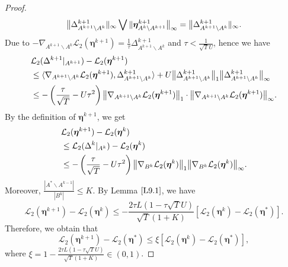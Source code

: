 \documentclass[12pt]{article}
\newcommand{\bb}{\Delta}
\newcommand{\boldeta}{\boldsymbol{\eta}}
\begin{document}
\begin{appendix}
\begin{proof}
\begin{equation*}
\big{\|}\bb_{A^{k+1}\backslash A^{k}}^{k+1}\|_{\infty}\bigvee\|\boldeta_{A^{k}\backslash A^{k+1}}^{k+1}\big{\|}_{\infty}=\big{\|}\bb_{A^{k+1}\backslash A^{k}}^{k+1}\|_{\infty}.
\end{equation*}
Due to $-\nabla_{A^{k+1}\backslash A^{k}}\mathcal{L}_2(\boldeta^{k+1})=\frac{1}{\tau}\bb_{A^{k+1}\backslash A^{k}}^{k+1}$ and $\tau<\frac{1}{ \sqrt{T}U}$, hence we have
\begin{equation*}
\begin{split}
&\mathcal{L}_2(\bb^{k+1}|_{A^{k+1}})-\mathcal{L}_2(\boldeta^{k+1})\\
&\leq\langle\nabla_{A^{k+1}\backslash A^{k}}\mathcal{L}_2(\boldeta^{k+1}),\bb_{A^{k+1}\backslash A^{k}}^{k+1}\rangle+U\big{\|}\bb_{A^{k+1}\backslash A^{k}}^{k+1}\big{\|}_1\big{\|}\bb_{A^{k+1}\backslash A^{k}}^{k+1}\big{\|}_{\infty}\\
&\leq-\left(\frac{\tau}{ \sqrt{T}}-U\tau^2\right)\big{\|}\nabla_{A^{k+1}\backslash A^{k}}\mathcal{L}_2(\boldeta^{k+1})\big{\|}_1\cdot\big{\|}\nabla_{A^{k+1}\backslash A^{k}}\mathcal{L}_2(\boldeta^{k+1})\big{\|}_{\infty}.
\end{split}
\end{equation*}
By the definition of $\boldeta^{k+1}$, we  get
\begin{equation*}
\begin{split}
&\mathcal{L}_2(\boldeta^{k+1})-\mathcal{L}_2(\boldeta^{k})\\
&\leq \mathcal{L}_2(\bb^{k}|_{A^{k}})-\mathcal{L}_2(\boldeta^{k})\\
&\leq-\left(\frac{\tau}{ \sqrt{T}}-U\tau^2\right)\big{\|}\nabla_{B^k}\mathcal{L}_2(\boldeta^{k})\big{\|}_1\big{\|}\nabla_{B^k}\mathcal{L}_2(\boldeta^{k})\big{\|}_{\infty}.
\end{split}
\end{equation*}
Moreover, $\frac{|A^*\backslash A^{k-1}|}{|B^{k}|}\leq K$.
By Lemma $\ref{L9.1}$, we have
\begin{equation*}
\mathcal{L}_2(\boldeta^{k+1})-\mathcal{L}_2(\boldeta^{k})\leq-\frac{2\tau L(1-\tau \sqrt{T} U)}{ \sqrt{T}(1+K)}[\mathcal{L}_2(\boldeta^{k})-\mathcal{L}_2(\boldeta^{*})].
\end{equation*}
Therefore, we obtain that
 \begin{equation*}
\mathcal{L}_2(\boldeta^{k+1})-\mathcal{L}_2(\boldeta^*)\leq\xi[\mathcal{L}_2(\boldeta^k)-\mathcal{L}_2(\boldeta^*)],
\end{equation*}
where
$\xi=1-\frac{2\tau L(1-\tau \sqrt{T}U)}{ \sqrt{T}(1+K)}\in(0,1)$.

\end{proof}
\end{appendix}
\end{document}
